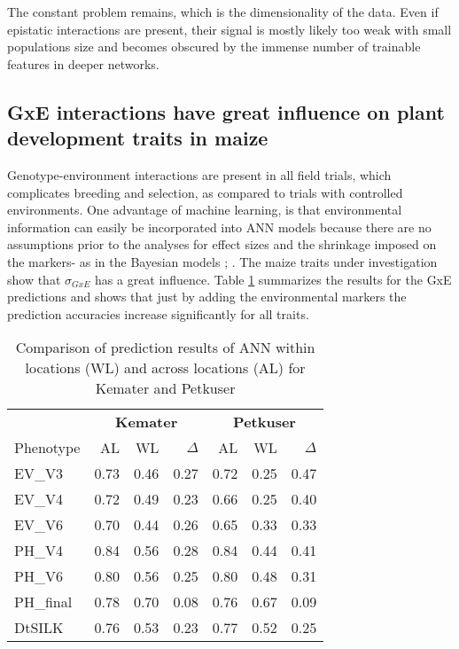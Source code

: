 The constant problem remains, which is the dimensionality of the data. Even if epistatic
interactions are present, their signal is mostly likely too weak with small populations
size and becomes obscured by the immense number of trainable features in deeper networks.


\subsection{GxE interactions have great influence on plant development traits in maize}

Genotype-environment interactions are present in all field trials, which complicates
breeding and selection, as compared to trials with controlled environments. One advantage
of machine learning, is that environmental information can easily be incorporated into ANN
models because there are no assumptions prior to the analyses for effect sizes and the
shrinkage imposed on the markers- as in the Bayesian models \cite{gianola2013};
\cite{bustos2016improvement}. The maize traits under investigation show that
$\sigma_{GxE}$ has a great influence. Table \ref{tab:ge_deltas} summarizes the results for
the GxE predictions and shows that just by adding the environmental markers the prediction
accuracies increase significantly for all traits.


\onehalfspacing
\begin{table}[H] 
 \centering
 \caption[Comparison of prediction results of ANN within locations and across locations
 for Kemater and Petkuser]{Comparison of prediction results of ANN within locations (WL)
   and across locations (AL) for Kemater and Petkuser}
 \begin{tabular}{lrrr|rrr}
   \toprule
   & \multicolumn{3}{c}{\textbf{Kemater}} & \multicolumn{3}{c}{\textbf{Petkuser}}    \\
   Phenotype & AL                                   & WL   & $\Delta$ & AL   & WL   & $\Delta$ \\ 
   \midrule
   EV\_V3    & 0.73                                 & 0.46 & 0.27     & 0.72 & 0.25 & 0.47     \\ 
   EV\_V4    & 0.72                                 & 0.49 & 0.23     & 0.66 & 0.25 & 0.40     \\ 
   EV\_V6    & 0.70                                 & 0.44 & 0.26     & 0.65 & 0.33 & 0.33     \\ 
   PH\_V4    & 0.84                                 & 0.56 & 0.28     & 0.84 & 0.44 & 0.41     \\ 
   PH\_V6    & 0.80                                 & 0.56 & 0.25     & 0.80 & 0.48 & 0.31     \\ 
   PH\_final & 0.78                                 & 0.70 & 0.08     & 0.76 & 0.67 & 0.09     \\ 
   DtSILK    & 0.76                                 & 0.53 & 0.23     & 0.77 & 0.52 & 0.25     \\ 
   \bottomrule
 \end{tabular}
\label{tab:ge_deltas}
\end{table}
\doublespacing

